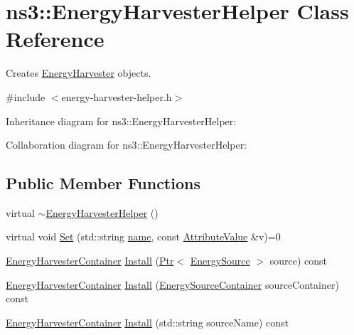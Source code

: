 \hypertarget{classns3_1_1EnergyHarvesterHelper}{}\section{ns3\+:\+:Energy\+Harvester\+Helper Class Reference}
\label{classns3_1_1EnergyHarvesterHelper}


Creates \hyperlink{classns3_1_1EnergyHarvester}{Energy\+Harvester} objects.  




{\ttfamily \#include $<$energy-\/harvester-\/helper.\+h$>$}



Inheritance diagram for ns3\+:\+:Energy\+Harvester\+Helper\+:


Collaboration diagram for ns3\+:\+:Energy\+Harvester\+Helper\+:
\subsection*{Public Member Functions}
\begin{DoxyCompactItemize}
\item 
virtual \hyperlink{classns3_1_1EnergyHarvesterHelper_a106b3402a3068f5c6974f3d2680db17b}{$\sim$\+Energy\+Harvester\+Helper} ()
\item 
virtual void \hyperlink{classns3_1_1EnergyHarvesterHelper_ac66d65adbe46b6edb84049f3b080de0f}{Set} (std\+::string \hyperlink{generate__test__data__lte__spectrum__model_8m_ab74e6bf80237ddc4109968cedc58c151}{name}, const \hyperlink{classns3_1_1AttributeValue}{Attribute\+Value} \&v)=0
\item 
\hyperlink{classns3_1_1EnergyHarvesterContainer}{Energy\+Harvester\+Container} \hyperlink{classns3_1_1EnergyHarvesterHelper_a8052f695e91e098cdb73a2a165570b40}{Install} (\hyperlink{classns3_1_1Ptr}{Ptr}$<$ \hyperlink{classns3_1_1EnergySource}{Energy\+Source} $>$ source) const 
\item 
\hyperlink{classns3_1_1EnergyHarvesterContainer}{Energy\+Harvester\+Container} \hyperlink{classns3_1_1EnergyHarvesterHelper_a84cf9de6031011a94e84b44b7741eb91}{Install} (\hyperlink{classns3_1_1EnergySourceContainer}{Energy\+Source\+Container} source\+Container) const 
\item 
\hyperlink{classns3_1_1EnergyHarvesterContainer}{Energy\+Harvester\+Container} \hyperlink{classns3_1_1EnergyHarvesterHelper_ad5bf73780e413e76bf42a09996745e5a}{Install} (std\+::string source\+Name) const 
\end{DoxyCompactItemize}
